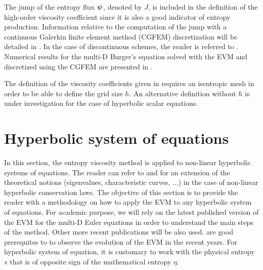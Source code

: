 %
The jump of the entropy flux $\boldsymbol\psi$, denoted by $J$, is included in the definition of the high-order viscosity coefficient since it is also a good indicator of entropy production. Information relative to the computation of the jump with a continuous Galerkin finite element method (CGFEM) discretization will be detailed in . In the case of discontinuous schemes, the reader is referred to \cite{valentin}. Numerical results for the multi-D Burger's equation solved with the EVM  and discretized using the CGFEM are presented in .
%
\begin{remark}
The definition of the viscosity coefficients given in  requires an isentropic mesh in order to be able to define the grid size $h$. An alternative definition without $h$ is under investigation for the case of hyperbolic scalar equations.
  
\end{remark}


\section{Hyperbolic system of equations}\label{sec:hyp_sect1b}
In this section, the entropy viscosity method is applied to non-linear hyperbolic systems of equations. The reader can refer to \cite{Toro} and \cite{Leveque} for an extension of the theoretical notions (eigenvalues, characteristic curves, $\ldots$) in the case of non-linear hyperbolic conservation laws. The objective of this section is to provide the reader with a methodology on how to apply the EVM to any hyperbolic system of equations. For academic purpose, we will rely on the latest published version of the EVM \cite{valentin} for the multi-D Euler equations in order to understand the main steps of the method. Other more recent publications will be also used. \cite{jlg, jlg2} are good prerequites to \cite{valentin} to observe the evolution of the EVM in the recent years. For hyperbolic system of equation, it is customary to work with the physical entropy $s$ that is of opposite sign of the mathematical entropy $\eta$.\\

